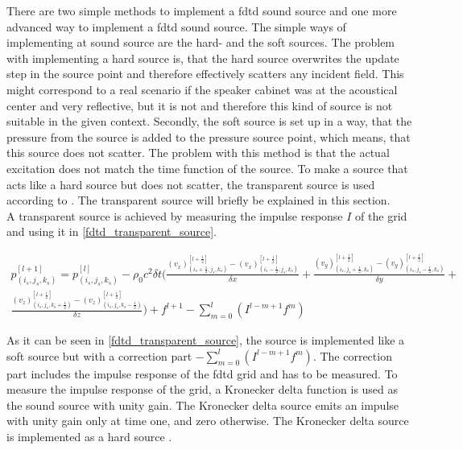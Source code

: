 There are two simple methods to implement a \gls{fdtd} sound source and one more advanced way to implement a \gls{fdtd} sound source. The simple ways of implementing at sound source are the hard- and the soft sources. The problem with implementing a hard source is, that the hard source overwrites the update step in the source point and therefore effectively scatters any incident field. This might correspond to a real scenario if the speaker cabinet was at the acoustical center and very reflective, but it is not and therefore this kind of source is not suitable in the given context. Secondly, the soft source is set up in a way, that the pressure from the source is added to the pressure source point, which means, that this source does not scatter. The problem with this method is that the actual excitation does not match the time function of the source. To make a source that acts like a hard source but does not scatter, the transparent source is used according to \citep{FDTDtransparent}. The transparent source will briefly be explained in this section. \\



A transparent source is achieved by measuring the impulse response $I$ of the grid and using it in \autoref{fdtd_transparent_source}.

\begin{multline}\label{fdtd_transparent_source}
p_{(i_{s},j_{s},k_{s})}^{[l+1]}=p_{(i_{s},j_{s},k_{s})}^{[l]} - \rho_0 c^2 \delta t  \Biggl( \frac{(v_x)_{(i_{s}+\frac{1}{2},j_{s},k_{s})}^{[l+\frac{1}{2}]} - (v_x)_{(i_{s}-\frac{1}{2},j_{s},k_{s})}^{[l+\frac{1}{2}]}}{\delta x} +
 \frac{(v_y)_{(i_{s},j_{s}+\frac{1}{2},k_{s})}^{[l+\frac{1}{2}]}-(v_y)_{(i_{s},j_{s}-\frac{1}{2},k_{s})}^{[l+\frac{1}{2}]}}{\delta y} + \\ 
 \frac{(v_z)_{(i_{s},j_{s},k_{s}+\frac{1}{2})}^{[l+\frac{1}{2}]}-(v_z)_{(i_{s},j_{s},k_{s}-\frac{1}{2})}^{[l+\frac{1}{2}]}}{\delta z} \Biggr)
+f^{l+1}-\sum_{m=0}^{l} \left( I^{l-m+1}f^m \right)
\end{multline}

        \startexplain
    \stopexplain

As it can be seen in \autoref{fdtd_transparent_source}, the source is implemented like a soft source but with a correction part $-\sum_{m=0}^{l} \left( I^{l-m+1}f^m \right)$. The correction part includes the impulse response of the \gls{fdtd} grid and has to be measured. To measure the impulse response of the grid, a Kronecker delta function is used as the sound source with unity gain. The Kronecker delta source emits an impulse with unity gain only at time one, and zero otherwise. The Kronecker delta source is implemented as a hard source \citep{FDTDtransparent}. \\


